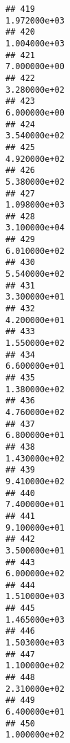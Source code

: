 \documentclass[
]{article}
\begin{document}
\begin{verbatim}
## 419                                                               1.972000e+03
## 420                                                               1.004000e+03
## 421                                                               7.000000e+00
## 422                                                               3.280000e+02
## 423                                                               6.000000e+00
## 424                                                               3.540000e+02
## 425                                                               4.920000e+02
## 426                                                               5.380000e+02
## 427                                                               1.098000e+03
## 428                                                               3.100000e+04
## 429                                                               6.010000e+02
## 430                                                               5.540000e+02
## 431                                                               3.300000e+01
## 432                                                               4.200000e+01
## 433                                                               1.550000e+02
## 434                                                               6.600000e+01
## 435                                                               1.380000e+02
## 436                                                               4.760000e+02
## 437                                                               6.800000e+01
## 438                                                               1.430000e+02
## 439                                                               9.410000e+02
## 440                                                               7.400000e+01
## 441                                                               9.100000e+01
## 442                                                               3.500000e+01
## 443                                                               6.000000e+02
## 444                                                               1.510000e+03
## 445                                                               1.465000e+03
## 446                                                               1.503000e+03
## 447                                                               1.100000e+02
## 448                                                               2.310000e+02
## 449                                                               6.400000e+01
## 450                                                               1.000000e+02

\end{verbatim}
\end{document}
